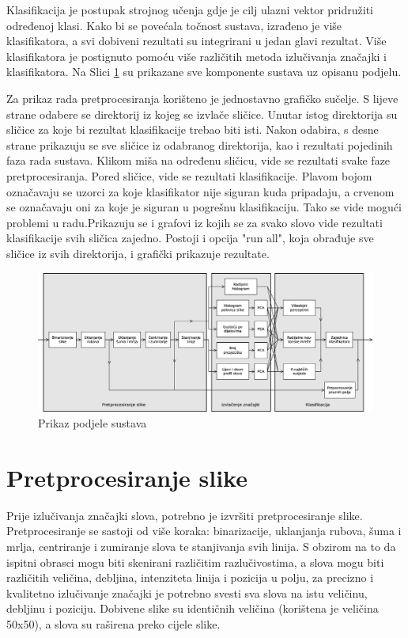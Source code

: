 \documentclass[a4paper,twocolumn,dvipdfm]{article}
\begin{document}
Klasifikacija je postupak strojnog učenja gdje je cilj ulazni vektor pridružiti
određenoj klasi. Kako bi se povećala točnost sustava, izrađeno je više
klasifikatora, a svi dobiveni rezultati su integrirani u jedan glavi rezultat.
Više klasifikatora je postignuto pomoću više različitih metoda izlučivanja
značajki i klasifikatora. Na Slici \ref{figure:cijeliSustav} su prikazane sve
komponente sustava uz opisanu podjelu.

Za prikaz rada pretprocesiranja korišteno je jednostavno grafičko sučelje.
S lijeve strane odabere se direktorij iz kojeg se izvlače sličice. Unutar istog
direktorija su sličice za koje bi rezultat klasifikacije trebao biti isti.
Nakon odabira, s desne strane prikazuju se sve sličice iz odabranog direktorija,
kao i rezultati pojedinih faza rada sustava. Klikom miša na određenu sličicu,
vide se rezultati svake faze pretprocesiranja. Pored sličice, vide se rezultati
klasifikacije. Plavom bojom označavaju se uzorci za koje klasifikator nije
siguran kuda pripadaju, a crvenom se označavaju oni za koje je siguran u
pogrešnu klasifikaciju. Tako se vide mogući problemi u radu.Prikazuju se i
grafovi iz kojih se za svako slovo vide rezultati klasifikacije svih sličica
zajedno. Postoji i opcija "run all", koja obrađuje sve sličice iz svih
direktorija, i grafički prikazuje rezultate.


\begin{figure}
\centering
\includegraphics[width=\textwidth]{Diagram1.eps}
\caption{Prikaz podjele sustava}
\label{figure:cijeliSustav}
\end{figure}

\section{Pretprocesiranje slike}
Prije izlučivanja značajki slova, potrebno je izvršiti pretprocesiranje slike.
Pretprocesiranje se sastoji od više koraka: binarizacije, uklanjanja rubova,
šuma i mrlja, centriranje i zumiranje slova te stanjivanja svih linija. S
obzirom na to da ispitni obrasci mogu biti skenirani različitim razlučivostima,
a slova mogu biti različitih veličina, debljina, intenziteta linija i pozicija u
polju, za precizno i kvalitetno izlučivanje značajki je potrebno svesti sva
slova na istu veličinu, debljinu i poziciju. Dobivene slike su identičnih
veličina (korištena je veličina 50x50), a slova su raširena preko cijele slike.
\end{document}
